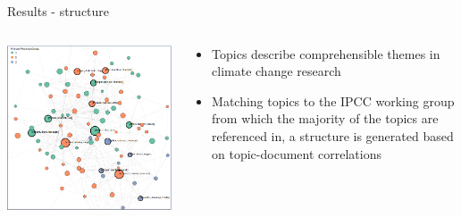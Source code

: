 \documentclass[9pt]{beamer}
\begin{document}
\begin{frame}{Results - structure}

\begin{columns}
	\begin{column}{0.65\linewidth}
		\begin{center}	
			\vspace*{-0.1\linewidth}
			\includegraphics[width=\linewidth]{../plots/network_wg_654}
		\end{center}
	\end{column}
	\begin{column}{0.35\linewidth}
		\begin{center}
			\begin{itemize}
				\item<1-> Topics describe comprehensible themes in climate change research
				\item<2-> Matching topics to the IPCC working group from which the majority of the topics are referenced in, a structure is generated based on topic-document correlations
			\end{itemize}
		\end{center}
	\end{column}
\end{columns}

\end{frame}
\end{document}
